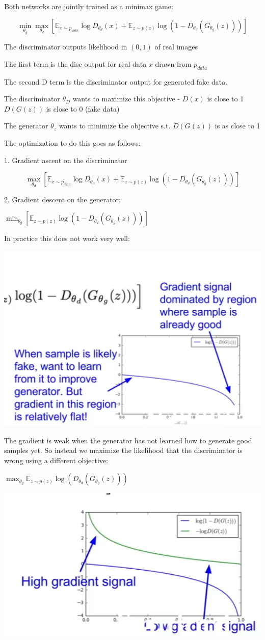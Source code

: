 Both networks are jointly trained as a minimax game:

$$ \min_{\theta_g} \max_{\theta_d} \left[ \mathbb{E}_{x\sim p_{data}}\log D_{\theta_d}(x)+\mathbb{E}_{z\sim p(z)}\log(1-D_{\theta_d}(G_{\theta_g}(z))) \right]$$

The discriminator outputs likelihood in  $(0,1)$ of real images

The first term is the disc output for real data $x$ drawn from $p_{data}$

The second D term is the discriminator output for generated fake data.

The discriminator $\theta_D$ wants to maximize this objective - $D(x)$ is close to 1 $D(G(z))$ is close to 0 (fake data)

The generator $\theta_z$  wants to minimize the objective s.t. $D(G(z))$ is as close to 1

The optimization to do this goes as follows: 

1. Gradient ascent on the discriminator

   $$ \max_{\theta_d} \left[ \mathbb{E}_{x\sim p_{data}}\log D_{\theta_d}(x)+\mathbb{E}_{z\sim p(z)}\log(1-D_{\theta_d}(G_{\theta_g}(z))) \right]$$

2. Gradient descent on the generator:

   $\min_{\theta_g} \left[ \mathbb{E}_{z\sim p(z)}\log(1-D_{\theta_d}(G_{\theta_g}(z))) \right]$

In practice this does not work very well:

\includegraphics[width=0.5\columnwidth]{fei_fei_li/lecture_13/gan_loss.png}

The gradient is weak when the generator has not learned how to generate good samples yet. So instead we maximize the likelihood that the discriminator is wrong using a different objective:

$\max_{\theta_g} \mathbb{E}_{z\sim p(z)}\log(D_{\theta_d}(G_{\theta_g}(z)))  $

\includegraphics[width=0.5\columnwidth]{fei_fei_li/lecture_13/gan_fixed_loss.png}

